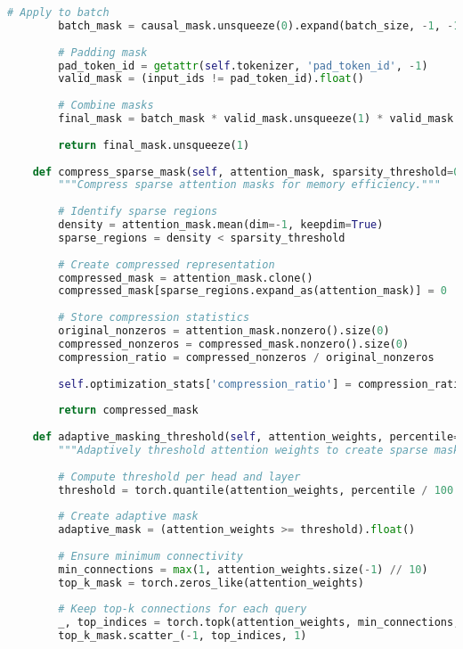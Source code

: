 \begin{lstlisting}[language=Python, caption=Attention mask optimization techniques]
        # Apply to batch
        batch_mask = causal_mask.unsqueeze(0).expand(batch_size, -1, -1)
        
        # Padding mask
        pad_token_id = getattr(self.tokenizer, 'pad_token_id', -1)
        valid_mask = (input_ids != pad_token_id).float()
        
        # Combine masks
        final_mask = batch_mask * valid_mask.unsqueeze(1) * valid_mask.unsqueeze(2)
        
        return final_mask.unsqueeze(1)
        
    def compress_sparse_mask(self, attention_mask, sparsity_threshold=0.1):
        """Compress sparse attention masks for memory efficiency."""
        
        # Identify sparse regions
        density = attention_mask.mean(dim=-1, keepdim=True)
        sparse_regions = density < sparsity_threshold
        
        # Create compressed representation
        compressed_mask = attention_mask.clone()
        compressed_mask[sparse_regions.expand_as(attention_mask)] = 0
        
        # Store compression statistics
        original_nonzeros = attention_mask.nonzero().size(0)
        compressed_nonzeros = compressed_mask.nonzero().size(0)
        compression_ratio = compressed_nonzeros / original_nonzeros
        
        self.optimization_stats['compression_ratio'] = compression_ratio
        
        return compressed_mask
        
    def adaptive_masking_threshold(self, attention_weights, percentile=90):
        """Adaptively threshold attention weights to create sparse masks."""
        
        # Compute threshold per head and layer
        threshold = torch.quantile(attention_weights, percentile / 100.0, dim=-1, keepdim=True)
        
        # Create adaptive mask
        adaptive_mask = (attention_weights >= threshold).float()
        
        # Ensure minimum connectivity
        min_connections = max(1, attention_weights.size(-1) // 10)
        top_k_mask = torch.zeros_like(attention_weights)
        
        # Keep top-k connections for each query
        _, top_indices = torch.topk(attention_weights, min_connections, dim=-1)
        top_k_mask.scatter_(-1, top_indices, 1)
        

\end{lstlisting}

